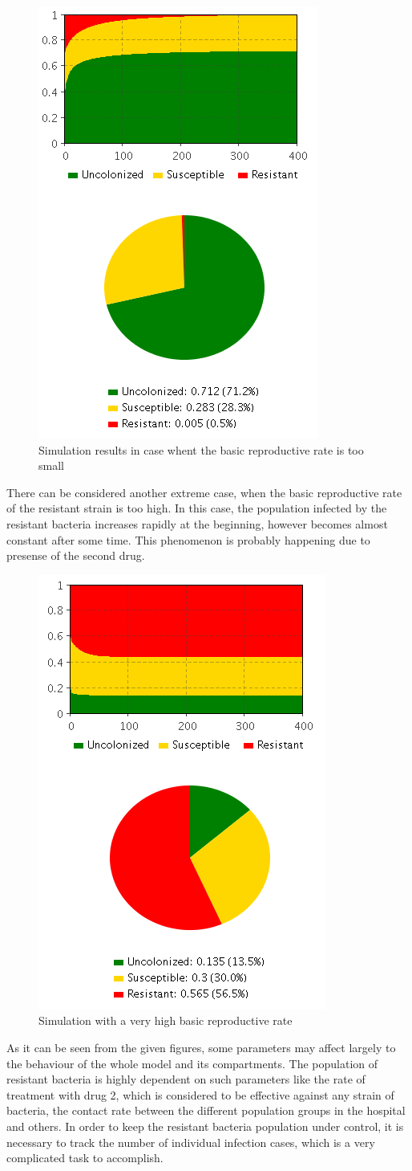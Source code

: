 \begin{figure}[H]
  \centering
  \includegraphics[height=0.7\textwidth]{img/screens/result/result2}
  \caption{Simulation results in case whent the basic reproductive rate is too small}
\end{figure}

There can be considered another extreme case, when the basic reproductive rate of the resistant strain is too high. In this case, the population infected by the resistant bacteria increases rapidly at the beginning, however becomes almost constant after some time. This phenomenon is probably happening due to presense of the second drug.

\begin{figure}[H]
  \centering
  \includegraphics[height=0.7\textwidth]{img/screens/result/result3}
  \caption{Simulation with a very high basic reproductive rate}
\end{figure}

As it can be seen from the given figures, some parameters may affect largely to the behaviour of the whole model and its compartments. The population of resistant bacteria is highly dependent on such parameters like the rate of treatment with drug 2, which is considered to be effective against any strain of bacteria, the contact rate between the different population groups in the hospital and others. In order to keep the resistant bacteria population under control, it is necessary to track the number of individual infection cases, which is a very complicated task to accomplish.